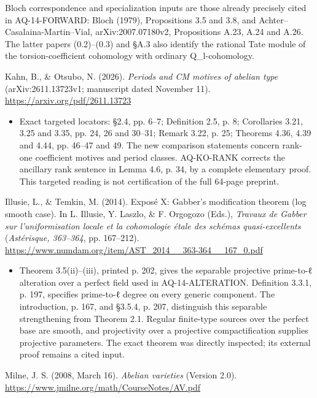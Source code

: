 \documentclass[11pt,a4paper]{article}
\providecommand{\tightlist}{\setlength{\itemsep}{0pt}\setlength{\parskip}{0pt}}
\theoremstyle{definition}\newtheorem{definition}[theorem]{Definition}
\theoremstyle{remark}\newtheorem{remark}[theorem]{Remark}
\begin{document}
Bloch correspondence and specialization inputs are those already
precisely cited in AQ-14-FORWARD: Bloch (1979), Propositions 3.5 and
3.8, and Achter--Casalaina-Martin--Vial, arXiv:2007.07180v2,
Propositions A.23, A.24 and A.26. The latter paper\textquotesingle s
(0.2)--(0.3) and §A.3 also identify the rational Tate module of the
torsion-coefficient cohomology with ordinary Q\_l-cohomology.

Kahn, B., \& Otsubo, N. (2026). \emph{Periods and CM motives of abelian
type} (arXiv:2611.13723v1; manuscript dated November 11).
\url{https://arxiv.org/pdf/2611.13723}

\begin{itemize}
\tightlist
\item
  Exact targeted locators: §2.4, pp. 6--7; Definition 2.5, p. 8;
  Corollaries 3.21, 3.25 and 3.35, pp. 24, 26 and 30--31; Remark 3.22,
  p. 25; Theorems 4.36, 4.39 and 4.44, pp. 46--47 and 49. The new
  comparison statements concern rank-one coefficient motives and period
  classes. AQ-KO-RANK corrects the ancillary rank sentence in Lemma 4.6,
  p. 34, by a complete elementary proof. This targeted reading is not
  certification of the full 64-page preprint.
\end{itemize}

Illusie, L., \& Temkin, M. (2014). Exposé X: Gabber's modification
theorem (log smooth case). In L. Illusie, Y. Laszlo, \& F. Orgogozo
(Eds.), \emph{Travaux de Gabber sur l'uniformisation locale et la
cohomologie étale des schémas quasi-excellents} (\emph{Astérisque,
363--364}, pp. 167--212).
\url{https://www.numdam.org/item/AST_2014__363-364__167_0.pdf}

\begin{itemize}
\tightlist
\item
  Theorem 3.5(ii)--(iii), printed p. 202, gives the separable projective
  prime-to-ℓ alteration over a perfect field used in AQ-14-ALTERATION.
  Definition 3.3.1, p. 197, specifies prime-to-ℓ degree on every generic
  component. The introduction, p. 167, and §3.5.4, p. 207, distinguish
  this separable strengthening from Theorem 2.1. Regular finite-type
  sources over the perfect base are smooth, and projectivity over a
  projective compactification supplies projective parameters. The exact
  theorem was directly inspected; its external proof remains a cited
  input.
\end{itemize}

Milne, J. S. (2008, March 16). \emph{Abelian varieties} (Version 2.0).
\url{https://www.jmilne.org/math/CourseNotes/AV.pdf}
\end{document}
